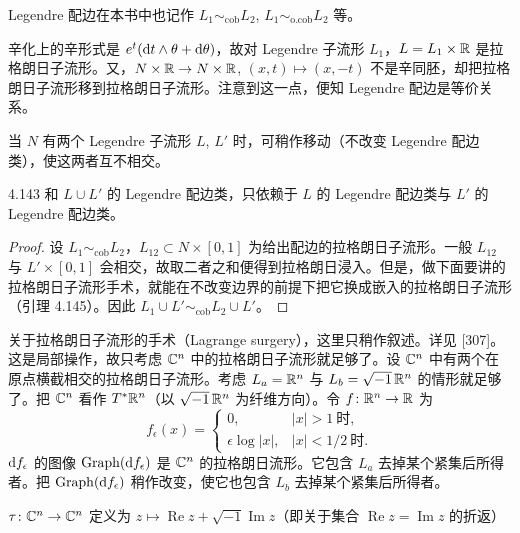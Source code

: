 Legendre 配边在本书中也记作 $L_1\sim_{\mathrm{cob}}L_2$, $L_1\sim_{\mathrm{o.cob}}L_2$ 等。

辛化上的辛形式是 $e^t(\mathrm{d} t\wedge\theta+\mathrm{d}\theta)$，故对 Legendre 子流形 $L_1$，$L=L_1\times\mathbb{R}$ 是拉格朗日子流形。又，$N\times\mathbb{R}\to N\times\mathbb{R}$, $(x,t)\mapsto(x,-t)$ 不是辛同胚，却把拉格朗日子流形移到拉格朗日子流形。注意到这一点，便知 Legendre 配边是等价关系。

当 $N$ 有两个 Legendre 子流形 $L$, $L'$ 时，可稍作移动（不改变 Legendre 配边类），使这两者互不相交。

\begin{lemma*}{4.143}
  和 $L\cup L'$ 的 Legendre 配边类，只依赖于 $L$ 的 Legendre 配边类与 $L'$ 的 Legendre 配边类。
\end{lemma*}

\begin{proof}
  设 $L_1\sim_{\mathrm{cob}}L_2$，$L_{12}\subset N\times[0,1]$ 为给出配边的拉格朗日子流形。一般 $L_{12}$ 与 $L'\times[0,1]$ 会相交，故取二者之和便得到拉格朗日浸入。但是，做下面要讲的拉格朗日子流形手术，就能在不改变边界的前提下把它换成嵌入的拉格朗日子流形（引理 4.145）。因此 $L_1\cup L'\sim_{\mathrm{cob}}L_2\cup L'$。
\end{proof}

关于拉格朗日子流形的手术（Lagrange surgery），这里只稍作叙述。详见 [307]。这是局部操作，故只考虑 $\mathbb{C}^n$ 中的拉格朗日子流形就足够了。设 $\mathbb{C}^n$ 中有两个在原点横截相交的拉格朗日子流形。考虑 $L_a=\mathbb{R}^n$ 与 $L_b=\sqrt{-1}\,\mathbb{R}^n$ 的情形就足够了。把 $\mathbb{C}^n$ 看作 $T^*\mathbb{R}^n$（以 $\sqrt{-1}\,\mathbb{R}^n$ 为纤维方向）。令 $f\colon\mathbb{R}^n\to\mathbb{R}$ 为
\[
  f_\epsilon(x)=
  \begin{cases}
    0, & |x|>1\ \text{时},\\
    \epsilon\log|x|, & |x|<1/2\ \text{时}.
  \end{cases}
\]
$\mathrm{d} f_\epsilon$ 的图像 $\mathrm{Graph}(\mathrm{d} f_\epsilon)$ 是 $\mathbb{C}^n$ 的拉格朗日流形。它包含 $L_a$ 去掉某个紧集后所得者。把 $\mathrm{Graph}(\mathrm{d} f_\epsilon)$ 稍作改变，使它也包含 $L_b$ 去掉某个紧集后所得者。

$\tau\colon\mathbb{C}^n\to\mathbb{C}^n$ 定义为 $z\mapsto\operatorname{Re}z+\sqrt{-1}\operatorname{Im}z$（即关于集合 $\operatorname{Re}z=\operatorname{Im}z$ 的折返）


